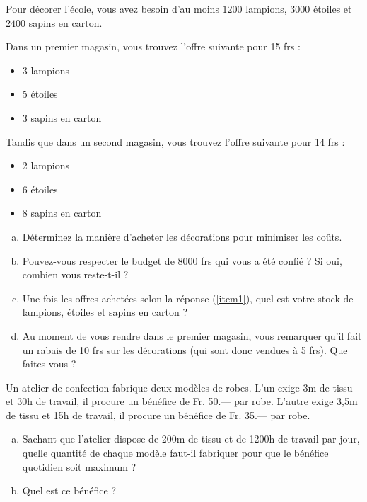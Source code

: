 \documentclass[twoside, a4paper, 12pt, openright, fullpage]{book}
\begin{document}
\begin{exercice}\label{exercice2}
Pour décorer l'école, vous avez besoin d'au moins $1200$ lampions, $3000$ étoiles et $2400$ sapins en carton.

Dans un premier magasin, vous trouvez l'offre suivante pour 15 frs :
\begin{itemize}
\item 3 lampions
\item 5 étoiles
\item 3 sapins en carton
\end{itemize}
Tandis que dans un second magasin, vous trouvez l'offre suivante pour 14 frs : 
\begin{itemize}
\item 2 lampions
\item 6 étoiles
\item 8 sapins en carton
\end{itemize}


\begin{enumerate}[(a)]
\item Déterminez la manière d'acheter les décorations pour minimiser les coûts.\label{item1}
\item Pouvez-vous respecter le budget de 8000 frs qui vous a été confié ? Si oui, combien vous reste-t-il ?
\item Une fois les offres achetées selon la réponse (\ref{item1}), quel est votre stock de lampions, étoiles et sapins en carton ?
\item Au moment de vous rendre dans le premier magasin, vous remarquer qu'il fait un rabais de 10 frs sur les décorations (qui sont donc vendues à 5 frs). Que faites-vous ?
\end{enumerate}
\end{exercice}

\begin{exercice}\label{exercice2}
Un atelier de confection fabrique deux modèles de robes. L’un exige 3m de tissu et 30h de travail, il procure un bénéfice de Fr. 50.— par robe. L’autre exige 3,5m de tissu et 15h de travail, il procure un bénéfice de Fr. 35.— par robe.

\begin{enumerate}[(a)]
\item Sachant que l’atelier dispose de 200m de tissu et de 1200h de travail par jour, quelle quantité de chaque modèle faut-il fabriquer pour que le bénéfice quotidien soit maximum ?
\item Quel est ce bénéfice ?
\end{enumerate}
\end{exercice}
\end{document}
